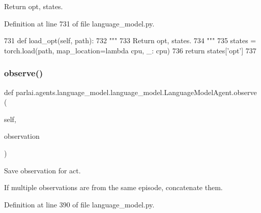 \begin{DoxyVerb}Return opt, states.
\end{DoxyVerb}
 

Definition at line 731 of file language\+\_\+model.\+py.


\begin{DoxyCode}
731     \textcolor{keyword}{def }load\_opt(self, path):
732         \textcolor{stringliteral}{"""}
733 \textcolor{stringliteral}{        Return opt, states.}
734 \textcolor{stringliteral}{        """}
735         states = torch.load(path, map\_location=\textcolor{keyword}{lambda} cpu, \_: cpu)
736         \textcolor{keywordflow}{return} states[\textcolor{stringliteral}{'opt'}]
737 
\end{DoxyCode}
\mbox{\label{classparlai_1_1agents_1_1language__model_1_1language__model_1_1LanguageModelAgent_a78df1c525c94c4cc68e05cd44ee374fd}} 
\subsubsection{\texorpdfstring{observe()}{observe()}}
{\footnotesize\ttfamily def parlai.\+agents.\+language\+\_\+model.\+language\+\_\+model.\+Language\+Model\+Agent.\+observe (\begin{DoxyParamCaption}\item[{}]{self,  }\item[{}]{observation }\end{DoxyParamCaption})}

\begin{DoxyVerb}Save observation for act.

If multiple observations are from the same episode, concatenate them.
\end{DoxyVerb}
 

Definition at line 390 of file language\+\_\+model.\+py.


